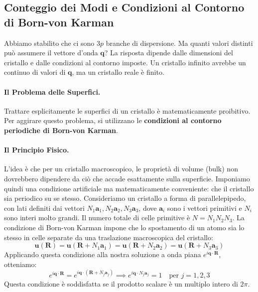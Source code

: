 \subsection{Conteggio dei Modi e Condizioni al Contorno di Born-von Karman}
Abbiamo stabilito che ci sono \(3p\) branche di dispersione. Ma quanti valori distinti può assumere il vettore d'onda \(\mathbf{q}\)? La risposta dipende dalle dimensioni del cristallo e dalle condizioni al contorno imposte. Un cristallo infinito avrebbe un continuo di valori di \(\mathbf{q}\), ma un cristallo reale è finito.

\paragraph{Il Problema delle Superfici.}
Trattare esplicitamente le superfici di un cristallo è matematicamente proibitivo. Per aggirare questo problema, si utilizzano le \textbf{condizioni al contorno periodiche di Born-von Karman}.

\paragraph{Il Principio Fisico.}
L'idea è che per un cristallo macroscopico, le proprietà di volume (bulk) non dovrebbero dipendere da ciò che accade esattamente sulla superficie. Imponiamo quindi una condizione artificiale ma matematicamente conveniente: che il cristallo sia periodico su se stesso.
Consideriamo un cristallo a forma di parallelepipedo, con lati definiti dai vettori \(N_1\mathbf{a}_1, N_2\mathbf{a}_2, N_3\mathbf{a}_3\), dove \(\mathbf{a}_i\) sono i vettori primitivi e \(N_i\) sono interi molto grandi. Il numero totale di celle primitive è \(N = N_1N_2N_3\).
La condizione di Born-von Karman impone che lo spostamento di un atomo sia lo stesso in celle separate da una traslazione macroscopica del cristallo:
\[ \mathbf{u}(\mathbf{R}) = \mathbf{u}(\mathbf{R} + N_1\mathbf{a}_1) = \mathbf{u}(\mathbf{R} + N_2\mathbf{a}_2) = \mathbf{u}(\mathbf{R} + N_3\mathbf{a}_3) \]
Applicando questa condizione alla nostra soluzione a onda piana \(e^{i\mathbf{q}\cdot\mathbf{R}}\), otteniamo:
\[ e^{i\mathbf{q}\cdot\mathbf{R}} = e^{i\mathbf{q}\cdot(\mathbf{R} + N_j\mathbf{a}_j)} \implies e^{i\mathbf{q}\cdot N_j\mathbf{a}_j} = 1 \quad \text{per } j=1,2,3 \]
Questa condizione è soddisfatta se il prodotto scalare è un multiplo intero di \(2\pi\).

